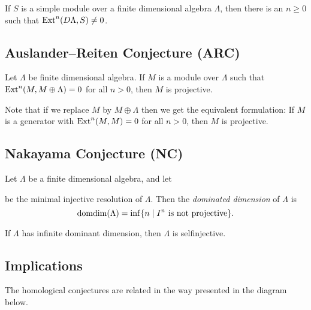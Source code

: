 \begin{conj} 
	If $S$ is a simple module over a finite dimensional algebra $\Lambda$, then there is an $n \geq 0$ such that $\operatorname{Ext}^n(D\Lambda, S) \neq 0$. 
\end{conj}

\subsection*{Auslander--Reiten Conjecture (ARC)}

\begin{conj} 
	Let $\Lambda$ be  finite dimensional algebra. If $M$ is a module over $\Lambda$ such that  $\operatorname{Ext}^n(M, M \oplus \Lambda) = 0$ for all $n > 0$, then $M$ is projective. 
\end{conj}

Note that if we replace $M$ by $M\oplus \Lambda$ then we get the equivalent formulation: If $M$ is a generator with $\operatorname{Ext}^n(M,M)=0$ for all $n>0$, then $M$ is projective.

\subsection*{Nakayama Conjecture (NC)}

\begin{defn}
	Let $\Lambda$ be a finite dimensional algebra, and let
	\begin{center}
	\end{center}
	be the minimal injective resolution of $\Lambda$. Then the \emph{dominated dimension} of $\Lambda$ is $$\operatorname{domdim}(\Lambda) = \inf\{n \; | \; I^n\text{ is not projective} \}.$$
\end{defn}

\begin{conj} 
	If $\Lambda$ has infinite dominant dimension, then $\Lambda$ is selfinjective.
\end{conj}

\subsection{Implications}
The homological conjectures are related in the way presented in the diagram below.


